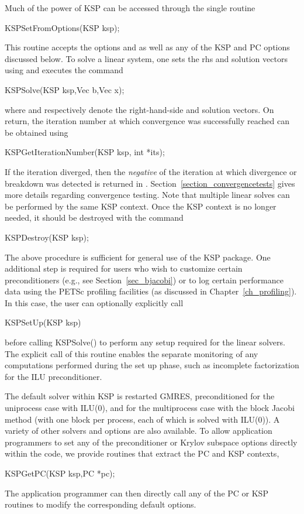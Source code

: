 Much of the power of KSP can be accessed through the single routine
\begin{tabbing}
  KSPSetFromOptions(KSP ksp);
\end{tabbing}
This 
routine accepts the options  and  as well as 
any of the KSP and PC options discussed below. 
To solve a linear system, one sets the rhs and solution vectors using
and executes the
command
\begin{tabbing}
  KSPSolve(KSP ksp,Vec b,Vec x);
\end{tabbing}
where  and  respectively denote the right-hand-side and
solution vectors.  On return, the iteration number at which convergence
was successfully reached can be obtained using 
\begin{tabbing}
  KSPGetIterationNumber(KSP ksp, int *its);
\end{tabbing}
If the iteration diverged, then the {\em negative} of the iteration at
which divergence or breakdown was detected is returned in .
 Section~\ref{section_convergencetests} gives more details regarding
convergence testing. Note that multiple linear solves can be performed by
the same KSP context. Once the KSP context is no longer needed, it should be
destroyed with the command 
\begin{tabbing}
  KSPDestroy(KSP ksp);
\end{tabbing}

The above procedure is sufficient for general use of the KSP package.
One additional step is required for users who wish to customize certain 
preconditioners (e.g., see Section~\ref{sec_bjacobi}) or to log certain 
performance data using the PETSc profiling facilities (as discussed in 
Chapter~\ref{ch_profiling}).
In this case, the user can optionally explicitly call 
\begin{tabbing}
  KSPSetUp(KSP ksp)
\end{tabbing}
before calling KSPSolve() to perform any setup required for 
the linear solvers.  The explicit call of this routine enables the
separate monitoring of any computations performed during the set up
phase, such as incomplete factorization for the ILU preconditioner.

The default solver within KSP is restarted GMRES, preconditioned for
the uniprocess case with ILU(0), and for the multiprocess case
with the block Jacobi method (with one block per process, each of
which is solved with ILU(0)). A variety of other solvers
and options are also available.
To allow application programmers to set any of the preconditioner or 
Krylov subspace options directly within the code, we provide routines
that extract the PC and KSP contexts, 
\begin{tabbing}
  KSPGetPC(KSP ksp,PC *pc);\\
\end{tabbing}
The application programmer can then directly call any of the PC or KSP 
routines to modify the corresponding default options.   

